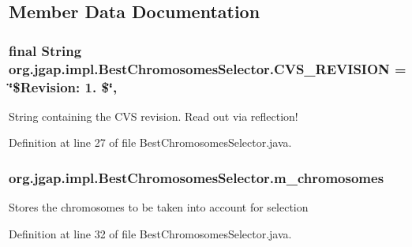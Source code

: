 \subsection{Member Data Documentation}
\hypertarget{classorg_1_1jgap_1_1impl_1_1_best_chromosomes_selector_a15ff008a0835eb0a54af6df185c864f9}{
\subsubsection[{C\-V\-S\-\_\-\-R\-E\-V\-I\-S\-I\-O\-N}]{\setlength{\rightskip}{0pt plus 5cm}final String org.\-jgap.\-impl.\-Best\-Chromosomes\-Selector.\-C\-V\-S\-\_\-\-R\-E\-V\-I\-S\-I\-O\-N = \char`\"{}\$Revision\-: 1. \$\char`\"{}\hspace{0.3cm}{\ttfamily [static]}, {\ttfamily [private]}}}\label{classorg_1_1jgap_1_1impl_1_1_best_chromosomes_selector_a15ff008a0835eb0a54af6df185c864f9}
String containing the C\-V\-S revision. Read out via reflection! 

Definition at line 27 of file Best\-Chromosomes\-Selector.\-java.

\hypertarget{classorg_1_1jgap_1_1impl_1_1_best_chromosomes_selector_ad57ed87538c6396da97b9da75e7b9fcc}{
\subsubsection[{m\-\_\-chromosomes}]{ org.\-jgap.\-impl.\-Best\-Chromosomes\-Selector.\-m\-\_\-chromosomes\hspace{0.3cm}{\ttfamily [private]}}}\label{classorg_1_1jgap_1_1impl_1_1_best_chromosomes_selector_ad57ed87538c6396da97b9da75e7b9fcc}
Stores the chromosomes to be taken into account for selection 

Definition at line 32 of file Best\-Chromosomes\-Selector.\-java.



